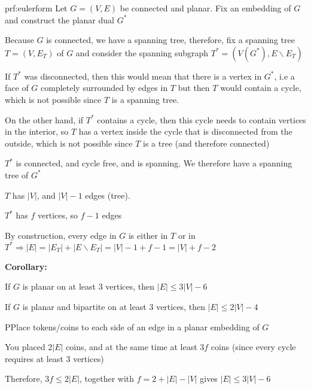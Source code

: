 \begin{prf}{prf:eulerform}
  Let $G = (V,E)$ be connected and planar. Fix an embedding of $G$ and construct the planar dual $G^*$
  \par\bigskip
  \noindent Because $G$ is connected, we have a spanning tree, therefore, fix a spanning tree $T = (V,E_T)$  of $G$ and consider the spanning subgraph $T^* = (V(G^*), E\backslash E_T)$
  \par\bigskip
  \noindent If $T^*$ was disconnected, then this would mean that there is a vertex in $G^*$, i.e a face of $G$ completely surrounded by edges in $T$ but then $T$  would contain a cycle, which is not possible since $T$ is a spanning tree.
  \par\bigskip
  \noindent On the other hand, if $T^*$ contains a cycle, then this cycle needs to contain vertices in the interior, so $T$ has a vertex inside the cycle that is disconnected from the outside, which is not possible since $T$ is a tree (and therefore connected)
  \par\bigskip
  \noindent $T^*$ is connected, and cycle free, and is spanning. We therefore have a spanning tree of $G^*$
  \par\bigskip
  \noindent $T$ has $\left|V\right|$, and $\left|V\right|-1$ edges (tree).\par
  \noindent $T^*$ has $f$ vertices, so $f-1$ edges
  \par\bigskip
  \noindent By construction, every edge in $G$ is either in $T$ or in $T^*\Rightarrow \left|E\right| = \left|E_T\right| + \left|E\backslash E_T\right| = \left|V\right|-1+f-1 = \left|V\right|+f-2$\par
\end{prf}
\par\bigskip
\noindent\textbf{Corollary:}\par
\noindent If $G$ is planar on at least 3 vertices, then $\left|E\right|\leq 3\left|V\right|-6$
\par\bigskip
\noindent If $G$ is planar and bipartite on at least 3 vertices, then $\left|E\right|\leq 2\left|V\right|-4$
\par\bigskip
\begin{prf}
  PPlace tokens/coins to each side of an edge in a planar embedding of $G$
  \par\bigskip
  \noindent You placed $2\left|E\right|$ coins, and at the same time at least $3f$ coins (since every cycle requires at least 3 vertices)
  \par\bigskip
  \noindent Therefore, $3f\leq 2\left|E\right|$, together with $f = 2+\left|E\right|-\left|V\right|$ gives $\left|E\right|\leq 3\left|V\right|-6$
\end{prf}

